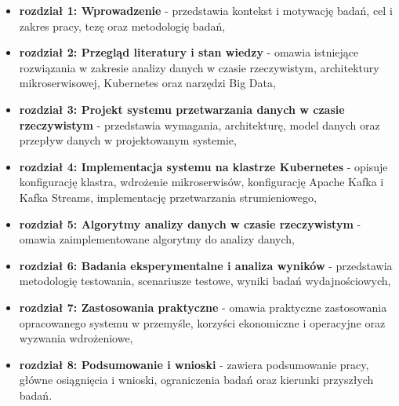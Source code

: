 \begin{itemize}
    \item \textbf{rozdział 1: Wprowadzenie} - przedstawia kontekst i motywację badań, cel i zakres pracy, tezę oraz metodologię badań,
    \item \textbf{rozdział 2: Przegląd literatury i stan wiedzy} - omawia istniejące rozwiązania w zakresie analizy danych w czasie rzeczywistym, architektury mikroserwisowej, Kubernetes oraz narzędzi Big Data,
    \item \textbf{rozdział 3: Projekt systemu przetwarzania danych w czasie rzeczywistym} - przedstawia wymagania, architekturę, model danych oraz przepływ danych w projektowanym systemie,
    \item \textbf{rozdział 4: Implementacja systemu na klastrze Kubernetes} - opisuje konfigurację klastra, wdrożenie mikroserwisów, konfigurację Apache Kafka i Kafka Streams, implementację przetwarzania strumieniowego,
    \item \textbf{rozdział 5: Algorytmy analizy danych w czasie rzeczywistym} - omawia zaimplementowane algorytmy do analizy danych,
    \item \textbf{rozdział 6: Badania eksperymentalne i analiza wyników} - przedstawia metodologię testowania, scenariusze testowe, wyniki badań wydajnościowych,
    \item \textbf{rozdział 7: Zastosowania praktyczne} - omawia praktyczne zastosowania opracowanego systemu w przemyśle, korzyści ekonomiczne i operacyjne oraz wyzwania wdrożeniowe,
    \item \textbf{rozdział 8: Podsumowanie i wnioski} - zawiera podsumowanie pracy, główne osiągnięcia i wnioski, ograniczenia badań oraz kierunki przyszłych badań.
\end{itemize} 